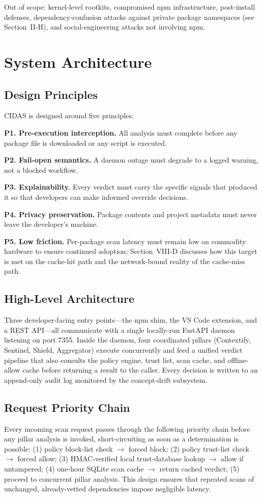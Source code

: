 \documentclass[journal]{IEEEtran}
\begin{document}
Out of scope: kernel-level rootkits, compromised npm infrastructure, post-install defenses,
dependency-confusion attacks against private package namespaces (see Section~II-H), and social-engineering
attacks not involving npm.

\section{System Architecture}

\subsection{Design Principles}
CIDAS is designed around five principles:

\textbf{P1. Pre-execution interception.} All analysis must complete before any package file is downloaded or
any script is executed.

\textbf{P2. Fail-open semantics.} A daemon outage must degrade to a logged warning, not a blocked workflow.

\textbf{P3. Explainability.} Every verdict must carry the specific signals that produced it so that
developers can make informed override decisions.

\textbf{P4. Privacy preservation.} Package contents and project metadata must never leave the developer's
machine.

\textbf{P5. Low friction.} Per-package scan latency must remain low on commodity hardware to ensure continued
adoption; Section~VIII-D discusses how this target is met on the cache-hit path and the network-bound reality
of the cache-miss path.

\subsection{High-Level Architecture}
Three developer-facing entry points---the npm shim, the VS Code extension, and a REST API---all communicate
with a single locally-run FastAPI daemon listening on port 7355. Inside the daemon, four coordinated pillars
(Contextify, Sentinel, Shield, Aggregator) execute concurrently and feed a unified verdict pipeline that also
consults the policy engine, trust list, scan cache, and offline-allow cache before returning a result to the
caller. Every decision is written to an append-only audit log monitored by the concept-drift subsystem.

\subsection{Request Priority Chain}
Every incoming scan request passes through the following priority chain before any pillar analysis is
invoked, short-circuiting as soon as a determination is possible: (1) policy block-list check
$\rightarrow$ forced block; (2) policy trust-list check $\rightarrow$ forced allow; (3) HMAC-verified local
trust-database lookup $\rightarrow$ allow if untampered; (4) one-hour SQLite scan cache $\rightarrow$ return
cached verdict; (5) proceed to concurrent pillar analysis. This design ensures that repeated scans of
unchanged, already-vetted dependencies impose negligible latency.
\end{document}
